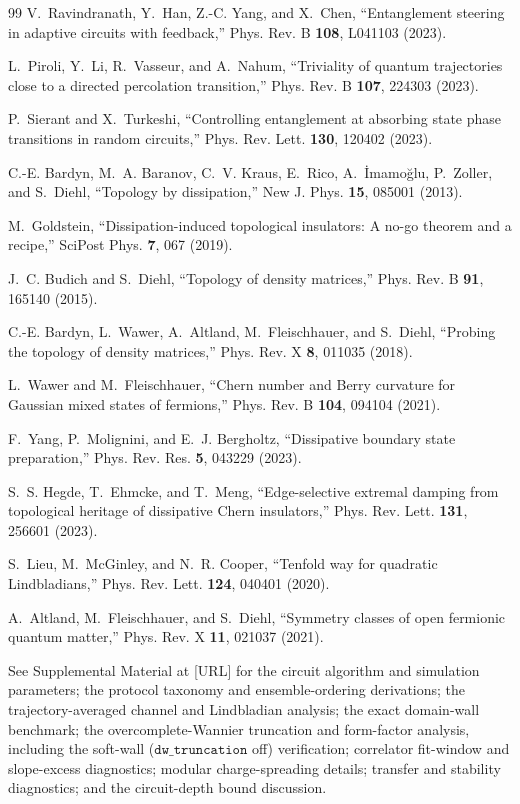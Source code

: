\documentclass[aps,prl,twocolumn,floatfix,superscriptaddress,nofootinbib]{revtex4-2}
\begin{document}
\begin{thebibliography}{99}
V.~Ravindranath, Y.~Han, Z.-C. Yang, and X.~Chen,
``Entanglement steering in adaptive circuits with feedback,''
Phys. Rev. B \textbf{108}, L041103 (2023).

L.~Piroli, Y.~Li, R.~Vasseur, and A.~Nahum,
``Triviality of quantum trajectories close to a directed percolation transition,''
Phys. Rev. B \textbf{107}, 224303 (2023).

P.~Sierant and X.~Turkeshi,
``Controlling entanglement at absorbing state phase transitions in random circuits,''
Phys. Rev. Lett. \textbf{130}, 120402 (2023).

C.-E. Bardyn, M.~A. Baranov, C.~V. Kraus, E.~Rico, A.~\.{I}mamo\u{g}lu, P.~Zoller, and S.~Diehl,
``Topology by dissipation,''
New J. Phys. \textbf{15}, 085001 (2013).

M.~Goldstein,
``Dissipation-induced topological insulators: A no-go theorem and a recipe,''
SciPost Phys. \textbf{7}, 067 (2019).

J.~C. Budich and S.~Diehl,
``Topology of density matrices,''
Phys. Rev. B \textbf{91}, 165140 (2015).

C.-E. Bardyn, L.~Wawer, A.~Altland, M.~Fleischhauer, and S.~Diehl,
``Probing the topology of density matrices,''
Phys. Rev. X \textbf{8}, 011035 (2018).

L.~Wawer and M.~Fleischhauer,
``Chern number and Berry curvature for Gaussian mixed states of fermions,''
Phys. Rev. B \textbf{104}, 094104 (2021).

F.~Yang, P.~Molignini, and E.~J. Bergholtz,
``Dissipative boundary state preparation,''
Phys. Rev. Res. \textbf{5}, 043229 (2023).

S.~S. Hegde, T.~Ehmcke, and T.~Meng,
``Edge-selective extremal damping from topological heritage of dissipative Chern insulators,''
Phys. Rev. Lett. \textbf{131}, 256601 (2023).

S.~Lieu, M.~McGinley, and N.~R. Cooper,
``Tenfold way for quadratic Lindbladians,''
Phys. Rev. Lett. \textbf{124}, 040401 (2020).

A.~Altland, M.~Fleischhauer, and S.~Diehl,
``Symmetry classes of open fermionic quantum matter,''
Phys. Rev. X \textbf{11}, 021037 (2021).

See Supplemental Material at [URL] for the circuit algorithm and simulation parameters; the protocol taxonomy and ensemble-ordering derivations; the trajectory-averaged channel and Lindbladian analysis; the exact domain-wall benchmark; the overcomplete-Wannier truncation and form-factor analysis, including the soft-wall ($\mathtt{dw\_truncation}$ off) verification; correlator fit-window and slope-excess diagnostics; modular charge-spreading details; transfer and stability diagnostics; and the circuit-depth bound discussion.


\end{thebibliography}
\end{document}
